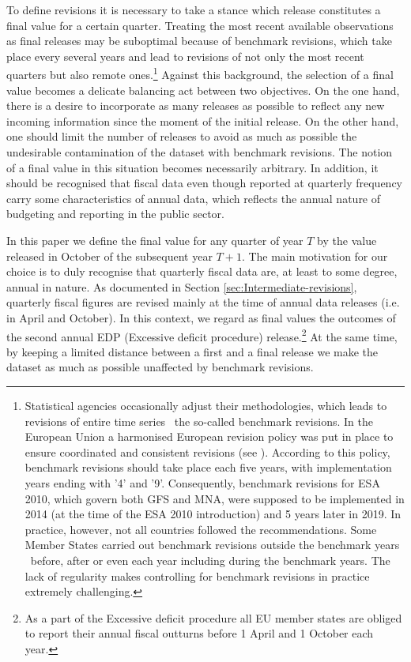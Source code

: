 To define revisions it is necessary to take a stance which release constitutes a final value for a certain quarter. Treating the most recent available observations as final releases may be suboptimal because of benchmark revisions, which take place every several years and lead to revisions of not only the most recent quarters but also remote ones.\footnote{Statistical agencies occasionally adjust their methodologies, which leads to revisions of entire time series \textemdash~the so-called benchmark revisions. In the European Union a harmonised European revision policy was put in place to ensure coordinated and consistent revisions (see \citet{ec_revision_guidelines}). According to this policy, benchmark revisions should take place each five years, with implementation years ending with '4' and '9'. Consequently, benchmark revisions for ESA 2010, which govern both GFS and MNA, were supposed to be implemented in 2014 (at the time of the ESA 2010 introduction) and 5 years later in 2019. In practice, however, not all countries  followed the recommendations. Some Member States carried out benchmark revisions outside the benchmark years \textemdash~before, after or even each year including during the benchmark years. The lack of regularity makes controlling for benchmark revisions in practice extremely challenging.}
Against this background, the selection of a final value becomes a delicate balancing act between two objectives. On the one hand, there is a desire to incorporate as many releases as possible to reflect any new incoming information since the moment of the initial release. On the other hand, one should limit the number of releases to avoid as much as possible the undesirable contamination of the dataset with benchmark revisions. The notion of a final value in this situation becomes necessarily arbitrary. In addition, it should be recognised that fiscal data even though reported at quarterly frequency carry some characteristics of annual data, which reflects the annual nature of budgeting and reporting in the public sector.

In this paper we define the final value for any quarter of year \emph{$T$} by the value released in October of the subsequent year $T+1$. The main motivation for our choice is to duly recognise that quarterly fiscal data are, at least to some degree, annual in nature. As documented in Section \ref{sec:Intermediate-revisions}, quarterly fiscal figures are revised mainly at the time of annual data releases (i.e. in April and October). In this context, we regard as final values the outcomes of the second annual EDP (Excessive deficit procedure) release.\footnote{As a part of the Excessive deficit procedure all EU member states are obliged to report their annual fiscal outturns before 1 April and 1 October each year.} At the same time, by keeping a limited distance between a first and a final release we make the dataset as much as possible unaffected by benchmark revisions. 

